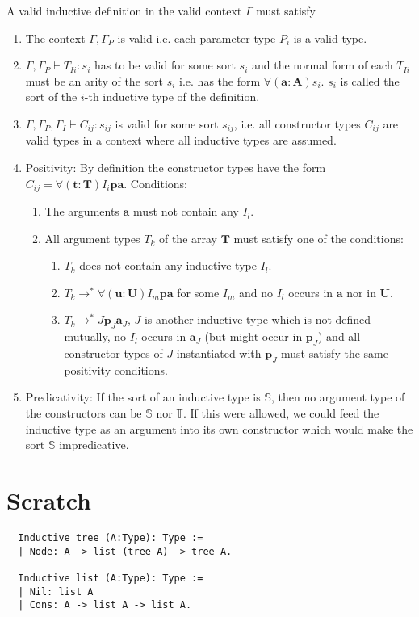 \documentclass[12pt]{article}
\def\abold{\mathbf{a}}
\def\Abold{\mathbf{A}}
\def\pbold{\mathbf{p}}
\def\tbold{\mathbf{t}}
\def\Tbold{\mathbf{T}}
\def\ubold{\mathbf{u}}
\def\Ubold{\mathbf{U}}
\def\Set{\mathbb{S}}
\def\Type{\mathbb{T}}
\theoremstyle{definition} \newtheorem{definition}{Definition}[section]
\theoremstyle{definition} \newtheorem{theorem}[definition]{Theorem}
\theoremstyle{definition} \newtheorem{lemma}[definition]{Lemma}
\begin{document}
A valid inductive definition in the valid context $\Gamma$ must satisfy
\begin{enumerate}
\item
  The context $\Gamma, \Gamma_P$ is valid i.e. each parameter type $P_i$ is a
  valid type.

\item $\Gamma, \Gamma_P \vdash T_{Ii}: s_i$ has to be valid for some sort
  $s_i$ and the normal form of each $T_{Ii}$ must be an arity of the sort
  $s_i$ i.e. has the form $\forall(\abold:\Abold) s_i$. $s_i$ is called the
  sort of the $i$-th inductive type of the definition.

\item
  $\Gamma, \Gamma_P, \Gamma_I \vdash C_{ij}: s_{ij}$ is valid for some sort
  $s_{ij}$, i.e. all constructor types $C_{ij}$ are valid types in a context
  where all inductive types are assumed.

\item Positivity: By definition the constructor types have the form
  $C_{ij} = \forall(\tbold:\Tbold) I_i \pbold\abold$. Conditions:
  \begin{enumerate}
  \item The arguments $\abold$ must not contain any $I_l$.

  \item All argument types $T_k$ of the array $\Tbold$ must satisfy one of
    the conditions:
    \begin{enumerate}

    \item $T_k$ does not contain any inductive type $I_l$.

    \item $T_k \to^* \forall(\ubold:\Ubold) I_m \pbold \abold$ for some $I_m$
      and no $I_l$ occurs in $\abold$ nor in $\Ubold$.

    \item $T_k \to^* J \pbold_J \abold_J$, $J$ is another inductive type which
      is not defined mutually, no $I_l$ occurs in $\abold_J$ (but might occur
      in $\pbold_J$) and all constructor types of $J$ instantiated with
      $\pbold_J$ must satisfy the same positivity conditions.
    \end{enumerate}
  \end{enumerate}

\item Predicativity: If the sort of an inductive type is $\Set$, then no
  argument type of the constructors can be $\Set$ nor $\Type$. If this were
  allowed, we could feed the inductive type as an argument into its own
  constructor which would make the sort $\Set$ impredicative.
\end{enumerate}









\section{Scratch}




\begin{lstlisting}
  Inductive tree (A:Type): Type :=
  | Node: A -> list (tree A) -> tree A.

  Inductive list (A:Type): Type :=
  | Nil: list A
  | Cons: A -> list A -> list A.
\end{lstlisting}
\end{document}
